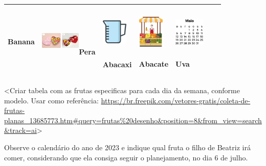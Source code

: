 \begin{escolha}
\begin{escolha}
{{{{\begin{longtable}[]{@{}lllllll@{}}
\begin{minipage}[t]{0.14\columnwidth}
Banana\strut
\end{minipage} & \begin{minipage}[t]{0.14\columnwidth}\raggedright\strut
\includegraphics[width=0.75448in,height=0.58371in]{media/image152.png}Pera\strut
\end{minipage} & \begin{minipage}[t]{0.14\columnwidth}\raggedright\strut
\includegraphics[width=0.48354in,height=0.74826in]{media/image153.png}

Abacaxi\strut
\end{minipage} & \begin{minipage}[t]{0.14\columnwidth}\raggedright\strut
\includegraphics[width=0.48530in,height=0.73899in]{media/image154.png}

Abacate\strut
\end{minipage} & \begin{minipage}[t]{0.14\columnwidth}\raggedright\strut
\includegraphics[width=0.55895in,height=0.73793in]{media/image155.png}

Uva\strut
\end{minipage}\tabularnewline
\bottomrule
\end{longtable}

\textless{}Criar tabela com as frutas especificas para cada dia da
semana, conforme modelo. Usar como referência:
\url{https://br.freepik.com/vetores-gratis/coleta-de-frutas-planas_13685773.htm\#query=frutas\%20desenho\&position=8\&from_view=search\&track=ai}\textgreater{}

Observe o calendário do ano de 2023 e indique qual fruta o filho de
Beatriz irá comer, considerando que ela consiga seguir o planejamento, no dia 6 de julho.

}}}}
\end{escolha}
\end{escolha}
